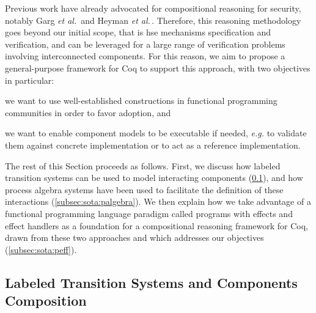 Previous work have already advocated for compositional reasoning for security,
notably Garg \emph{et al.}\,\cite{garg2010compositional} and Heyman \emph{et
  al.}\,\cite{heyman2012securemodel}.
%
Therefore, this reasoning methodology goes beyond our initial scope, that is
\ac{hse} mechanisms specification and verification, and can be leveraged for a
large range of verification problems involving interconnected components.
%
For this reason, we aim to propose a general-purpose framework for Coq to
support this approach, with two objectives in particular:
%
\begin{inparaenum}[(1)]
\item we want to use well-established constructions in functional programming
  communities  in order to favor adoption, and
\item we want to enable component models to be executable if needed, \emph{e.g.}
  to validate them against concrete implementation or to act as a reference
  implementation.
\end{inparaenum}

The rest of this Section proceeds as follows.
%
First, we discuss how labeled transition systems can be used to model
interacting components (\ref{subsec:sota:ioauto}), and how process algebra
systems have been used to facilitate the definition of these interactions
(\ref{subsec:sota:palgebra}).
%
We then explain how we take advantage of a functional programming language 
paradigm called programs with effects and effect handlers as a foundation for a
compositional reasoning framework for Coq, drawn from these two approaches  and which
addresses our objectives (\ref{subsec:sota:peff}).

\subsection{Labeled Transition Systems and Components Composition}
\label{subsec:sota:ioauto}

